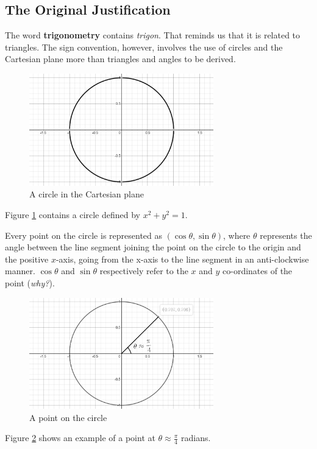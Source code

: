 \documentclass{article}
\begin{document}
\subsection{The Original Justification}

The word \textbf{trigonometry} contains \textit{trigon}. That reminds us that it is related to triangles. The sign convention, however, involves the use of circles and the Cartesian plane more than triangles and angles to be derived.

\begin{figure}[!h]
    \centering
    \includegraphics[width=8cm]{circle}
    \caption{A circle in the Cartesian plane}
    \label{fig:circle}
\end{figure}

Figure \ref{fig:circle} contains a circle defined by $x^2+y^2=1$. 

Every point on the circle is represented as $(\cos\theta,\sin\theta)$, where $\theta$ represents the angle between the line segment joining the point on the circle to the origin and the positive $x$-axis, going from the x-axis to the line segment in an anti-clockwise manner. $\cos\theta$ and $\sin\theta$ respectively refer to the $x$ and $y$ co-ordinates of the point (\textit{why?}).

\begin{figure}[!h]
    \centering
    \includegraphics[width=8cm]{circlepoint}
    \caption{A point on the circle}
    \label{fig:circlepoint}
\end{figure}

Figure \ref{fig:circlepoint} shows an example of a point at $\theta\approx\frac{\pi}{4}$ radians.
\end{document}
